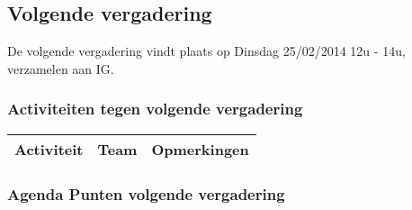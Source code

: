 \subsection{Volgende vergadering}
De volgende vergadering vindt plaats op Dinsdag 25/02/2014 12u - 14u, verzamelen aan IG.
\subsubsection{Activiteiten tegen volgende vergadering} \label{sec:TODOActiviteiten}
\begin{table} [H]
	\centering
	\begin{tabular} {l|l|l}
		\textbf{Activiteit} & \textbf{Team} & \textbf{Opmerkingen} \\
		\hline

	\end{tabular}
\end{table}

\subsubsection{Agenda Punten volgende vergadering}